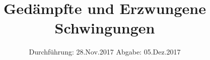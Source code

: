 

\subject{354}
\title{Gedämpfte und Erzwungene Schwingungen}
\date{%
  Durchführung: 28.Nov.2017
  \hspace{3em}
  Abgabe: 05.Dez.2017
}



\maketitle
\thispagestyle{empty}
\tableofcontents
\newpage






\printbibliography{}


